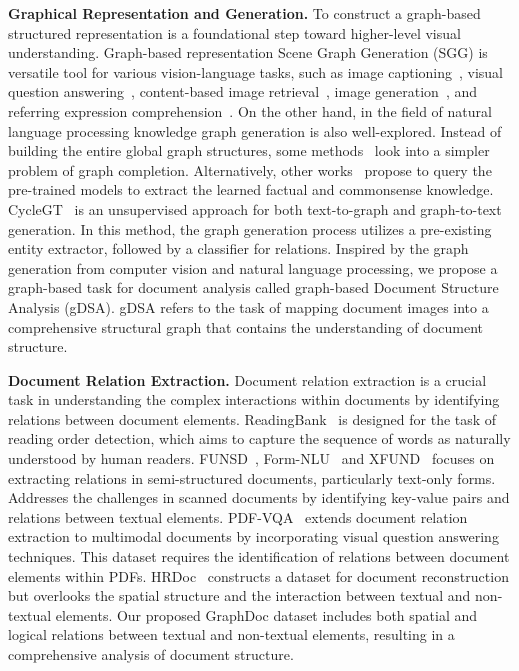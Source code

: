 \noindent\textbf{Graphical Representation and Generation.}
To construct a graph-based structured representation is a foundational step toward higher-level visual understanding. 
Graph-based representation 
Scene Graph Generation (SGG) is versatile tool for various vision-language tasks, such as image captioning~\citep{gao2018image,yang2019auto}, visual question answering~\citep{li2019relation,zhang2019empirical}, content-based image retrieval~\citep{johnson2015image,schuster2015generating}, image generation~\citep{johnson2018image,mittal2019interactive}, and referring expression comprehension~\citep{yang2019cross}. On the other hand, in the field of natural language processing knowledge graph generation is also well-explored.
Instead of building the entire global graph structures, some methods~\citep{li2016commonsense,yao2019kg,malaviya2020commonsense} look into a simpler problem of graph completion.
Alternatively, other works~\citep{roberts2020much,jiang2020can,shin2020autoprompt,li2021prefix} propose to query the pre-trained models to extract the learned factual and commonsense knowledge.
CycleGT~\citep{guo2020cyclegt} is an unsupervised approach for both text-to-graph and graph-to-text generation. In this method, the graph generation process utilizes a pre-existing entity extractor, followed by a classifier for relations. Inspired by the graph generation from computer vision and natural language processing, we propose a graph-based task for document analysis called graph-based Document Structure Analysis (gDSA). gDSA refers to the task of mapping document images into a comprehensive structural graph that contains the understanding of document structure.

\noindent \textbf{Document Relation Extraction.}
Document relation extraction is a crucial task in understanding the complex interactions within documents by identifying relations between document elements. ReadingBank~\citep{wang2021layoutreader} is designed for the task of reading order detection, which aims to capture the sequence of words as naturally understood by human readers. FUNSD~\citep{jaume2019funsd}, Form-NLU~\citep{ding2023form} and XFUND~\citep{xu-etal-2022-xfund} focuses on extracting relations in semi-structured documents, particularly text-only forms. Addresses the challenges in scanned documents by identifying key-value pairs and relations between textual elements. PDF-VQA~\citep{pdfvqa} extends document relation extraction to multimodal documents by incorporating visual question answering techniques. This dataset requires the identification of relations between document elements within PDFs. HRDoc~\citep{Ma_Du_Hu_Zhang_Zhang_Zhu_Liu_2023} constructs a dataset for document reconstruction but overlooks the spatial structure and the interaction between textual and non-textual elements. Our proposed GraphDoc dataset includes both spatial and logical relations between textual and non-textual elements, resulting in a comprehensive analysis of document structure.  
